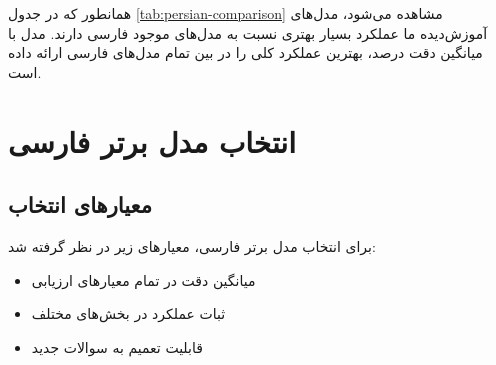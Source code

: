 \documentclass[11pt, a4paper, oneside]{book}
\begin{document}
	\begin{table}[h!]
		\centering
		\caption{مقایسه عملکرد مدل‌های فارسی بر روی مجموعه داده‌های  پزشکی}
		\label{tab:persian-comparison}
		\begin{latin}
		\end{latin}
	\end{table}

	همانطور که در جدول \ref{tab:persian-comparison} مشاهده می‌شود، مدل‌های آموزش‌دیده ما عملکرد بسیار بهتری نسبت به مدل‌های موجود فارسی دارند. مدل  با میانگین دقت  درصد، بهترین عملکرد کلی را در بین تمام مدل‌های فارسی ارائه داده است.

	\section{انتخاب مدل برتر فارسی}
	\subsection{معیارهای انتخاب}
	برای انتخاب مدل برتر فارسی، معیارهای زیر در نظر گرفته شد:
	\begin{itemize}
		\item میانگین دقت در تمام معیارهای ارزیابی
		\item ثبات عملکرد در بخش‌های مختلف
		\item قابلیت تعمیم به سوالات جدید
	\end{itemize}
\end{document}
